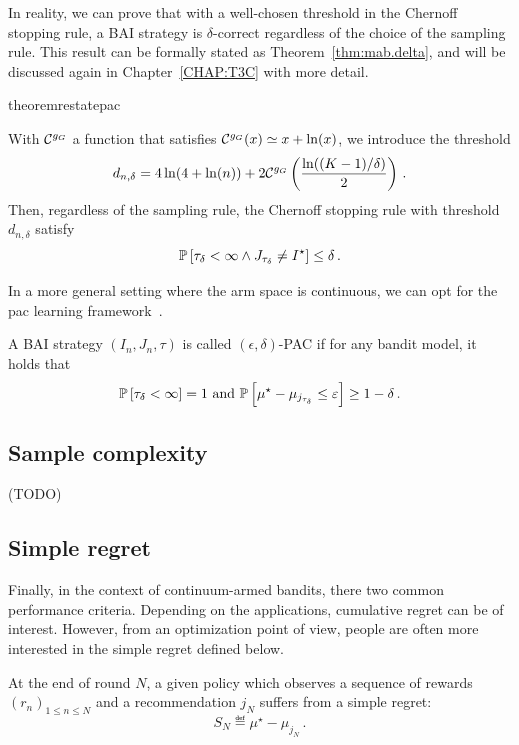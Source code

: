 In reality, we can prove that with a well-chosen threshold in the Chernoff stopping rule, a BAI strategy is $\delta$-correct regardless of the choice of the sampling rule. This result can be formally stated as Theorem~\ref{thm:mab.delta}, and will be discussed again in Chapter~\ref{CHAP:T3C} with more detail.

\begin{restatable}{theorem}{restatepac}\label{thm:mab.delta}
\begin{leftbar}[theorembar]
With $\mathcal{C}^{g_G}$ a function that satisfies $\mathcal{C}^{g_G}(x) \simeq x+\ln(x)$, we introduce the threshold
\begin{equation}
    d_{n,\delta} = 4\ln(4+\ln(n)) + 2 \mathcal{C}^{g_G}\left(\frac{\ln((K-1)/\delta)}{2}\right)\,.\label{def:mab.threshold_d}
\end{equation}
Then, regardless of the sampling rule, the Chernoff stopping rule with threshold $d_{n,\delta}$ satisfy 
\[ 
    \mathbb{P}\left[\tau_{\delta} < \infty \wedge J_{\tau_{\delta}} \neq I^\star\right] \leq \delta\,.
\]
\end{leftbar}
\end{restatable}

In a more general setting where the arm space is continuous, we can opt for the \gls{pac} learning framework~\citep{valiant1984pac}.

\begin{definition}\label{def:mab.pac}
\begin{leftbar}[defnbar]
A BAI strategy $(I_n,J_n,\tau)$ is called $(\epsilon,\delta)$-PAC if for any bandit model, it holds that
\[
	\mathbb{P}\left[\tau_\delta < \infty\right] = 1 \text{ and } \mathbb{P}\left[\mu^\star-\mu_{j_{\tau_\delta}}\leq \varepsilon\right] \geq 1-\delta\,.
\]
\end{leftbar}
\end{definition}

\subsection{Sample complexity}\label{sec:mab.performance.sample}

(TODO)

\subsection{Simple regret}\label{sec:mab.performance.simple}

Finally, in the context of continuum-armed bandits, there two common performance criteria. Depending on the applications, cumulative regret can be of interest. However, from an optimization point of view, people are often more interested in the \gls{simple regret} defined below. 

\begin{definition}\label{def:stoch_mab.simple_regret}
\begin{leftbar}[defnbar]
	At the end of round $N$, a given policy which observes a sequence of rewards $(r_n)_{1 \leq n \leq N}$ and a recommendation $j_N$ suffers from a simple regret:
	\[
		S_N \eqdef \mu^{\star} - \mu_{j_N}\,.
	\]
\end{leftbar}
\end{definition}